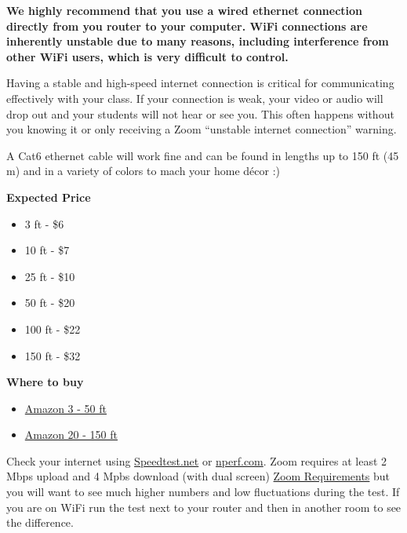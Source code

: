 \begin{gram}[Wiring Up]
\textbf{We highly recommend that you use a wired ethernet connection directly from you router to your computer.
%
WiFi connections are inherently unstable due to many reasons, including interference from other WiFi users, which is very difficult to control.
}

Having a stable and high-speed internet connection is critical for communicating effectively with your class. 
If your connection is weak, your video or audio will drop out and your students will not hear or see you.
This often happens without you knowing it or only receiving a Zoom ``unstable internet connection'' warning.


A Cat6 ethernet cable will work fine and can be found in lengths up to 150 ft (45 m) and in a variety of colors to mach your home d\'{e}cor :)

\textbf{Expected Price}
\begin{itemize}
	\item 3 ft - \$6
	\item 10 ft - \$7
	\item 25 ft - \$10
	\item 50 ft - \$20
	\item 100 ft - \$22
	\item 150 ft - \$32
\end{itemize}

\textbf{Where to buy}
\begin{itemize}
\item \href{https://www.amazon.com/AmazonBasics-RJ45-Cat-6-Ethernet-Patch-Cable-10-Feet-3-Meters/dp/B0134QJH4G/ref=sr_1_5?dchild=1&keywords=cat6%2Bethernet%2Bcable&qid=1597264670&sr=8-5&th=1}{Amazon 3 - 50 ft}
%
\item \href{https://www.amazon.com/Cable-Matters-Snagless-Ethernet-Black/dp/B007NZGPAY/ref=sr_1_3?dchild=1&keywords=cat6%2Bethernet%2Bcable&qid=1597264670&sr=8-3&th=1}{Amazon 20 - 150 ft}
\end{itemize}
\end{gram}


\begin{note}
	Check your internet using \href{https://www.speedtest.net}{Speedtest.net} or \href{https://www.nperf.com/en/}{nperf.com}. 
	Zoom requires at least 2 Mbps upload and 4 Mpbs download (with dual screen) \href{https://support.zoom.us/hc/en-us/articles/204003179-System-Requirements-for-Zoom-Rooms}{Zoom Requirements} 
	but you will want to see much higher numbers and low fluctuations during the test. If you are on WiFi run the test next to your router 
	and then in another room to see the difference.
\end{note}


